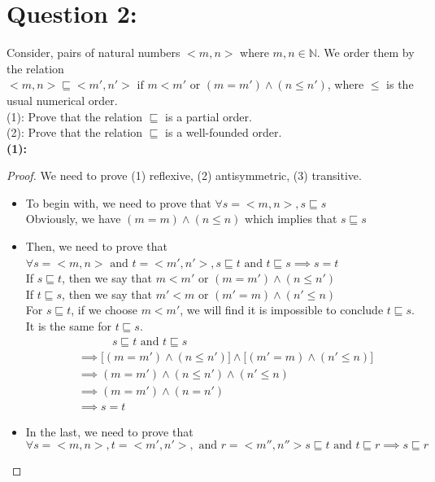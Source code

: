 \documentclass [9 pt]{article}
\theoremstyle{definition}
\begin{document}
\section*{Question 2: }
Consider, pairs of natural numbers $< m,n >$ where $m, n \in \mathbb{N}$. We order them by the relation \\
$<m, n> \sqsubseteq <m',n'> \text{ if } m < m' \text{ or }(m = m') \wedge (n \leq n')$, where $\leq$ is the usual numerical order.\\
(1): Prove that the relation $\sqsubseteq$ is a partial order.\\
(2): Prove that the relation $\sqsubseteq$ is a well-founded order.\\
\newline
\textbf{(1):}\\
\begin{proof}
	We need to  prove (1) reflexive, (2) antisymmetric, (3) transitive.
	\begin{itemize}
		\item To begin with, we need to prove that $ \forall s = <m, n>, s\sqsubseteq  s $\\
		Obviously, we have $(m = m) \wedge (n \leq n)$ which implies that $s \sqsubseteq s $
		\item Then, we need to prove that $ \forall s = <m ,n>\text{ and } t = <m', n'>, s \sqsubseteq t \text{ and } t \sqsubseteq s \implies s = t  $\\
		If $s \sqsubseteq t $, then we say that $  m < m' \text{ or }(m = m') \wedge (n \leq n') $\\
		If $t \sqsubseteq s $, then we say that $  m' < m \text{ or }(m' = m) \wedge (n' \leq n) $\\
		For  $s \sqsubseteq t $, if we choose $m < m'$, we will find it is impossible to conclude $t \sqsubseteq s$. It is the same for $t \sqsubseteq s$.
		\begin{align*}
		&\quad \quad \quad	s \sqsubseteq t \text{ and } t \sqsubseteq s \\
		&\implies \bigg[(m = m') \wedge (n \leq n')\bigg] \wedge \bigg[ (m' = m) \wedge (n' \leq n) \bigg]\\
		&\implies  (m = m') \wedge (n \leq n') \wedge (n' \leq n)\\
		&\implies  (m = m') \wedge (n = n')\\
		&\implies  s = t
		\end{align*} 
		\item In the last, we need to prove that $$ \forall s = <m ,n>, t = <m', n'>,\text{ and } r = <m'', n''> s \sqsubseteq t \text{ and } t \sqsubseteq r \implies s \sqsubseteq r  $$ 

\end{itemize}
\end{proof}
\end{document}
